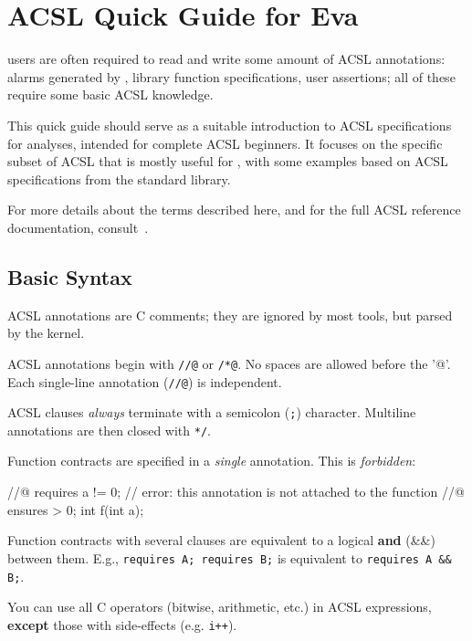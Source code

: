 \documentclass{frama-c-book}
\begin{document}



\appendix
\chapter{ACSL Quick Guide for Eva}
\label{sec:acsl-quick-guide}

\Eva{} users are often required to read and write some amount of ACSL
annotations: alarms generated by \Eva{}, library function specifications,
user assertions; all of these require some basic ACSL knowledge.

This quick guide should serve as a suitable introduction to ACSL specifications
for \Eva{} analyses, intended for complete ACSL beginners.
It focuses on the specific subset of ACSL that is mostly useful for \Eva{}, with
some examples based on ACSL specifications from the \FramaC standard library.

For more details about the terms described here, and for the full
ACSL reference documentation, consult~\cite{acsl}.

\section{Basic Syntax}

ACSL annotations are C comments; they are ignored by most tools, but parsed
by the \FramaC kernel.

ACSL annotations begin with \texttt{//@} or \texttt{/*@}. No spaces are allowed
before the '@'. Each single-line annotation (\texttt{//@}) is independent.

ACSL clauses {\em always} terminate with a semicolon (\texttt{;}) character.
Multiline annotations are then closed with \texttt{*/}.

Function contracts are specified in a {\em single} annotation.
This is {\em forbidden}:

\begin{listing-nonumber}
//@ requires a != 0; // error: this annotation is not attached to the function
//@ ensures \result > 0;
int f(int a);
\end{listing-nonumber}

Function contracts with several clauses are equivalent to a logical
\textbf{and} (\&\&) between them.
E.g., \verb+requires A; requires B;+ is equivalent to \verb+requires A && B;+.

You can use all C operators (bitwise, arithmetic, etc.) in ACSL expressions,
\textbf{except} those with side-effects (e.g. \texttt{i++}).
\end{document}
